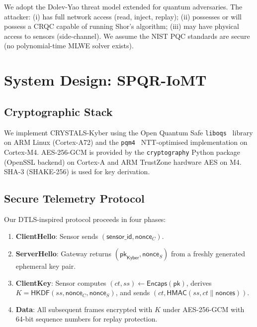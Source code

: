 \documentclass[10pt,journal,compsoc]{IEEEtran}
\begin{document}
We adopt the Dolev-Yao threat model extended for quantum adversaries.
The attacker:
(i) has full network access (read, inject, replay);
(ii) possesses or will possess a CRQC capable of running Shor's
algorithm;
(iii) may have physical access to sensors (side-channel).
We assume the NIST PQC standards are secure (no polynomial-time
MLWE solver exists).

\section{System Design: SPQR-IoMT}
\label{sec:system}

\subsection{Cryptographic Stack}

We implement CRYSTALS-Kyber using the Open Quantum Safe
\texttt{liboqs}~\cite{oqs2023} library on ARM Linux (Cortex-A72)
and the \texttt{pqm4}~\cite{kannwischer2019} NTT-optimised
implementation on Cortex-M4.
AES-256-GCM is provided by the \texttt{cryptography} Python package
(OpenSSL backend) on Cortex-A and ARM TrustZone hardware AES on M4.
SHA-3 (SHAKE-256) is used for key derivation.

\subsection{Secure Telemetry Protocol}

Our DTLS-inspired protocol proceeds in four phases:

\begin{enumerate}
\item \textbf{ClientHello}: Sensor sends $(\mathsf{sensor\_id},
  \mathsf{nonce}_C)$.
\item \textbf{ServerHello}: Gateway returns $(\mathsf{pk}_\mathsf{Kyber},
  \mathsf{nonce}_S)$ from a freshly generated ephemeral key pair.
\item \textbf{ClientKey}: Sensor computes $(ct, ss) \gets
  \mathsf{Encaps}(\mathsf{pk})$, derives
  $K = \mathsf{HKDF}(ss, \mathsf{nonce}_C, \mathsf{nonce}_S)$,
  and sends $(ct, \mathsf{HMAC}(ss, ct \| \mathsf{nonces}))$.
\item \textbf{Data}: All subsequent frames encrypted with
  $K$ under AES-256-GCM with 64-bit sequence numbers for
  replay protection.
\end{enumerate}
\end{document}
